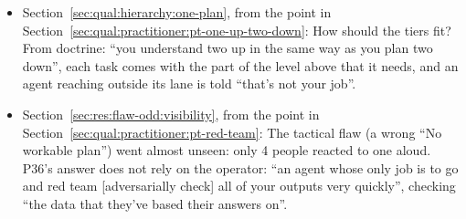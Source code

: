 \begin{itemize}[leftmargin=1.2em,itemsep=1pt]
\item Section~\ref{sec:qual:hierarchy:one-plan}, from the point in Section~\ref{sec:qual:practitioner:pt-one-up-two-down}: How should the tiers fit? From doctrine: ``you understand two up in the same way as you plan two down'', each task comes with the part of the level above that it needs, and an agent reaching outside its lane is told ``that's not your job''.
\item Section~\ref{sec:res:flaw-odd:visibility}, from the point in Section~\ref{sec:qual:practitioner:pt-red-team}: The tactical flaw (a wrong ``No workable plan'') went almost unseen: only 4 people reacted to one aloud. P36's answer does not rely on the operator: ``an agent whose only job is to go and red team [adversarially check] all of your outputs very quickly'', checking ``the data that they've based their answers on''.
\end{itemize}

